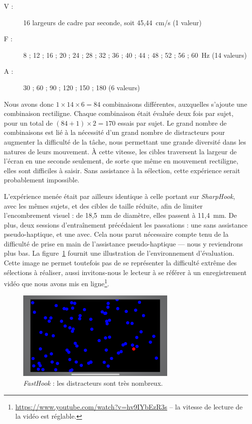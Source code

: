 	\begin{description}
		\item[V :] 16 largeurs de cadre par seconde, soit 45,44~cm/s (1 valeur)
		\item[F :] 8 ; 12 ; 16 ; 20 ; 24 ; 28 ; 32 ; 36 ; 40 ; 44 ; 48 ; 52 ; 56 ; 60~Hz (14 valeurs)
		\item[A :] 30 ; 60 ; 90 ; 120 ; 150 ; 180\textdegree{} (6 valeurs)
	\end{description}
	
	Nous avons donc $1\times{}14\times{}6 = 84$ combinaisons différentes, auxquelles s'ajoute une combinaison rectiligne. Chaque combinaison était évaluée deux fois par sujet, pour un total de $(84+1)\times{}2 = 170$ essais par sujet. Le grand nombre de combinaisons est lié à la nécessité d'un grand nombre de distracteurs pour augmenter la difficulté de la tâche, nous permettant une grande diversité dans les natures de leurs mouvement. À cette vitesse, les cibles traversent la largeur de l'écran en une seconde seulement, de sorte que même en mouvement rectiligne, elles sont difficiles à saisir. Sans assistance à la sélection, cette expérience serait probablement impossible.
	
	L'expérience menée était par ailleurs identique à celle portant sur \emph{SharpHook}, avec les mêmes sujets, et des cibles de taille réduite, afin de limiter l'encombrement visuel : de 18,5~mm de diamètre, elles passent à 11,4~mm. De plus, deux sessions d'entraînement précédaient les passations : une sans assistance pseudo-haptique, et une avec. Cela nous parut nécessaire compte tenu de la difficulté de prise en main de l'assistance pseudo-haptique --- nous y reviendrons plus bas. La figure~\ref{fig:pseudohaptics} fournit une illustration de l'environnement d'évaluation. Cette image ne permet toutefois pas de se représenter la difficulté extrême des sélections à réaliser, aussi invitons-nous le lecteur à se référer à un enregistrement vidéo que nous avons mis en ligne\footnote{\url{https://www.youtube.com/watch?v=hv9IYbEzR3s} -- la vitesse de lecture de la vidéo est réglable.}.
	
	\begin{figure}[!htb]
		\centering
		\includegraphics[width=0.7\textwidth]{figures/ch5/pseudohaptics}
		\caption[Évaluation de \emph{FastHook}]{\emph{FastHook} : les distracteurs sont très nombreux.}
		\label{fig:pseudohaptics}
	\end{figure}
	
